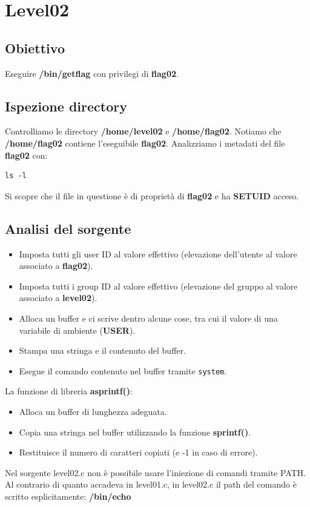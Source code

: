 \section{Level02}
\subsection{Obiettivo}
Eseguire \textbf{/bin/getflag} con privilegi di \textbf{flag02}.
\subsection{Ispezione directory}
Controlliamo le directory \textbf{/home/level02} e \textbf{/home/flag02}. Notiamo che \textbf{/home/flag02} contiene l’eseguibile \textbf{flag02}.
Analizziamo i metadati del file \textbf{flag02} con: 
\begin{lstlisting}[style=bashstyle]
    ls -l
\end{lstlisting}
Si scopre che il file in questione è di proprietà di \textbf{flag02} e ha \textbf{SETUID} acceso.

\subsection{Analisi del sorgente}
\begin{itemize}
    \item Imposta tutti gli user ID al valore effettivo (elevazione dell’utente al valore associato a \textbf{flag02}).
    \item Imposta tutti i group ID al valore effettivo (elevazione del gruppo al valore associato a \textbf{level02}).
    \item Alloca un buffer e ci scrive dentro alcune cose, tra cui il valore di una variabile di ambiente (\textbf{USER}).
    \item Stampa una stringa e il contenuto del buffer.
    \item Esegue il comando contenuto nel buffer tramite \texttt{system}.
\end{itemize}
La funzione di libreria \textbf{asprintf()}:
\begin{itemize}
    \item Alloca un buffer di lunghezza adeguata.
    \item Copia una stringa nel buffer utilizzando la funzione \textbf{sprintf()}.
    \item Restituisce il numero di caratteri copiati (e -1 in caso di errore).
\end{itemize}
Nel sorgente level02.c non è possibile usare l’iniezione di comandi tramite PATH. Al contrario di quanto accadeva in level01.c, in level02.c il path del comando è scritto esplicitamente: \textbf{/bin/echo}

